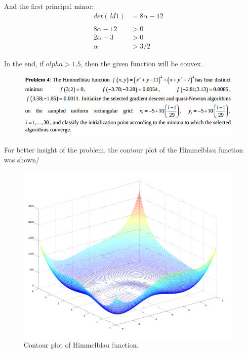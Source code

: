 \documentclass[eng,openany]{mgr}
\begin{document}
And the first principal minor:\\
\begin{align*}
det(M1) &= 8\alpha - 12\\
\\
8\alpha -12 &> 0\\
2\alpha -3 &> 0\\
\alpha &> 3/2
\end{align*}

In the end, if $alpha > 1.5$, then the given function will be convex.
\clearpage 

\begin{figure}[h]
\centering
\includegraphics[width=0.7\linewidth]{screenshot012}
\label{fig:screenshot012}
\end{figure}

For better insight of the problem, the contour plot of the Himmelblau function was shown/
\begin{figure}[h]
\centering
\includegraphics[width=0.7\linewidth]{screenshot013}
\caption{Contour plot of Himmelblau function.}
\label{fig:screenshot013}
\end{figure}
\end{document}
